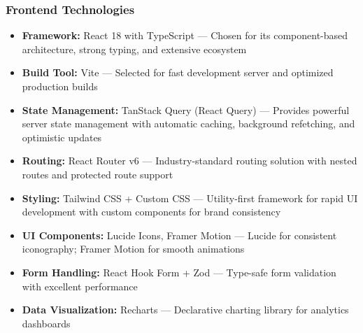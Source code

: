 \documentclass[12pt,a4paper]{article}
\begin{document}
\subsubsection{Frontend Technologies}
\begin{itemize}[noitemsep]
  \item \textbf{Framework:} React 18 with TypeScript — Chosen for its component-based architecture, strong typing, and extensive ecosystem
  \item \textbf{Build Tool:} Vite — Selected for fast development server and optimized production builds
  \item \textbf{State Management:} TanStack Query (React Query) — Provides powerful server state management with automatic caching, background refetching, and optimistic updates
  \item \textbf{Routing:} React Router v6 — Industry-standard routing solution with nested routes and protected route support
  \item \textbf{Styling:} Tailwind CSS + Custom CSS — Utility-first framework for rapid UI development with custom components for brand consistency
  \item \textbf{UI Components:} Lucide Icons, Framer Motion — Lucide for consistent iconography; Framer Motion for smooth animations
  \item \textbf{Form Handling:} React Hook Form + Zod — Type-safe form validation with excellent performance
  \item \textbf{Data Visualization:} Recharts — Declarative charting library for analytics dashboards
\end{itemize}
\end{document}
